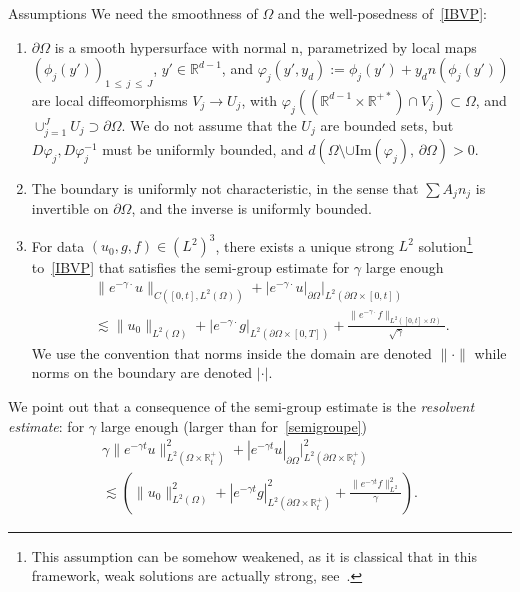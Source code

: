 \documentclass[AHL,Unicode,longabstracts,published]{cedram}
\newcommand{\R}{\mathbb{R}}
\newcommand{\rmn}{\mathrm{n}}
\renewcommand{\Im}{\mathrm{Im}}
\begin{document}
\begin{enonce}{Assumptions}
We need the smoothness of $\Omega$ and the well-posedness of~\eqref{IBVP}:
\begin{enumerate}
\item \label{assump1}
$\partial\Omega$ is a smooth hypersurface with normal $\rmn$, parametrized by local maps $(\phi_j(y'))_{1\,\leq\,j\,\leq \,J}$, $y'\in \R^{d-1}$, and $\varphi_j(y',y_d):=\phi_j(y')+y_d n(\phi_j(y'))$ are local diffeomorphisms $V_j\to U_j$, with $\varphi_j ((\R^{d-1}\times \R^{+*})\cap V_j) \subset
\Omega$, and $\cup_{j=1}^JU_j\supset \partial\Omega$. We do not assume that the $U_j$ are bounded sets, but $D\varphi_j,D\varphi_j^{-1}$ must be uniformly bounded, and $d(\Omega\setminus
\cup \Im(\varphi_j),\,
\partial\Omega)>0$.
\item \label{charac}
The boundary is uniformly not characteristic, in the sense that $\sum A_jn_j$ is invertible on $\partial\Omega$, and the inverse is uniformly bounded.
\item For data $(u_0,g,f)\in (L^2)^3$, there exists a unique strong $L^2$ solution\footnote{This assumption can be somehow weakened, as it is classical that in this framework, weak solutions are actually strong, see~\cite{LaxPhillips}.} to~\eqref{IBVP} that satisfies the semi-group estimate for $\gamma$ large enough
\begin{multline}\label{semigroupe}
\|e^{-\gamma \cdot}u\|_{C([0,t],L^2(\Omega))}+ |e^{-\gamma \cdot}u|_{\partial\Omega}|_{L^2(\partial\Omega\times [0,t])}\\
\lesssim \|u_0\|_{L^2(\Omega)}+ |e^{-\gamma \cdot }g|_{L^2(\partial\Omega\times [0,T])}
+\frac{\|e^{-\gamma \cdot}f\|_{L^2 ([0,t]\times \Omega)}}{\sqrt{\gamma}}.
\end{multline}
We use the convention that norms inside the domain are denoted $\|\cdot\|$ while norms on the boundary are denoted $|\cdot|$.
\end{enumerate}
\end{enonce}
We point out that a consequence of the semi-group estimate is the \emph{resolvent estimate}: for $\gamma$ large enough (larger than for~\eqref{semigroupe})
\begin{multline}\label{resolv}
\gamma \|e^{-\gamma t}u\|_{L^2(\Omega\times \R_t^+)}^2 +|e^{-\gamma t}u|_{\partial\Omega}|_{L^2(\partial\Omega\times \R_t^+)}^2
\\
\lesssim \left(\|u_0\|_{L^2(\Omega)}^2+ |e^{-\gamma t}g|_{L^2(\partial\Omega\times \R_t^+)}^2+\frac{
\|e^{-\gamma t}f\|_{L^2}^2}{\gamma}\right).
\end{multline}
\end{document}
